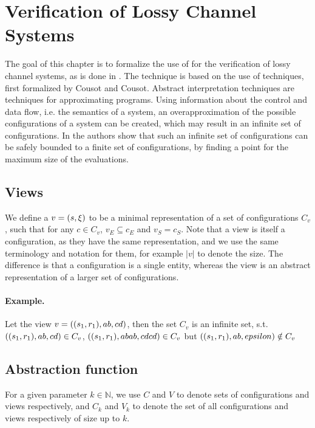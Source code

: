 \newpage
\section{Verification of Lossy Channel Systems}
\label{model}
The goal of this chapter is to formalize the use of  for the verification of lossy channel systems, as is done in \cite{parosh}. The technique is based on the use of  techniques, first formalized by Cousot and Cousot\cite{cousot1977}. Abstract interpretation techniques are techniques for approximating programs. Using information about the control and data flow, i.e. the semantics of a system, an overapproximation of the possible configurations of a system can be created, which may result in an infinite set of configurations. In \cite{parosh} the authors show that such an infinite set of configurations can be safely bounded to a finite set of configurations, by finding a  point for the maximum size of the evaluations.


\subsection{Views}
\label{subwords}
We define a  $v= (s, \xi)$ to be a minimal representation of a set of configurations $C_v$, such that for any $c \in C_v$, $v_E \subseteq c_E$ and $v_S = c_S$. Note that a view is itself a configuration, as they have the same representation, and we use the same terminology and notation for them, for example $|v|$ to denote the size. The difference is that a configuration is a single entity, whereas the view is an abstract representation of a larger set of configurations.

\paragraph{Example.} Let the view $v = ((s_1, r_1), ab, cd)$, then the set $C_v$ is an infinite set, s.t. $((s_1, r_1), ab, cd) \in C_v$, $((s_1, r_1), abab, cdcd) \in C_v$ but $((s_1, r_1), ab, epsilon) \notin C_v$


\subsection{Abstraction function}
\label{alphagamma}
For a given parameter $k \in \mathbb{N}$, we use $C$ and $V$ to denote sets of configurations and views respectively, and $C_k$ and $V_k$ to denote the set of all configurations and views respectively of size up to $k$.

